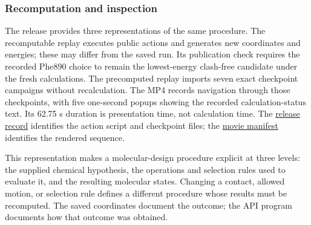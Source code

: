 \subsubsection{Recomputation and inspection}

The release provides three representations of the same procedure. The recomputable replay executes public actions and generates new coordinates and energies; these may differ from the saved run. Its publication check requires the recorded Phe890 choice to remain the lowest-energy clash-free candidate under the fresh calculations. The precomputed replay imports seven exact checkpoint campaigns without recalculation. The MP4 records navigation through those checkpoints, with five one-second popups showing the recorded calculation-status text. Its 62.75 s duration is presentation time, not calculation time. The \href{https://molarium.org/design-history/publications/sos1/designer-intent-2026-09-04/release.json}{release record} identifies the action script and checkpoint files; the \href{https://molarium.org/design-history/publications/sos1/designer-intent-2026-09-04/checkpoint-popups-v2/movie.json}{movie manifest} identifies the rendered sequence.

This representation makes a molecular-design procedure explicit at three levels: the supplied chemical hypothesis, the operations and selection rules used to evaluate it, and the resulting molecular states. Changing a contact, allowed motion, or selection rule defines a different procedure whose results must be recomputed. The saved coordinates document the outcome; the API program documents how that outcome was obtained.
